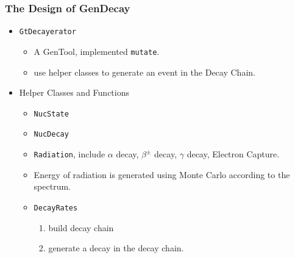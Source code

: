 \begin{frame}
    \frametitle{The Design of GenDecay}
    \begin{itemize}
        \item {\tt GtDecayerator}
            \begin{itemize}
                \item A GenTool, implemented {\tt mutate}.
                \item use helper classes to generate an event in the Decay
                    Chain.
            \end{itemize}
        \item Helper Classes and Functions
            \begin{itemize}
                \item {\tt NucState}
                \item {\tt NucDecay}
                \item {\tt Radiation}, include $\alpha$ decay, $\beta^\pm$
                    decay, $\gamma$ decay, Electron Capture.
                \item Energy of radiation is generated using Monte Carlo
                    according to the spectrum.
                \item {\tt DecayRates}
                    \begin{enumerate}
                        \item build decay chain
                        \item generate a decay in the decay chain.
                    \end{enumerate}
            \end{itemize}
    \end{itemize}
\end{frame}
